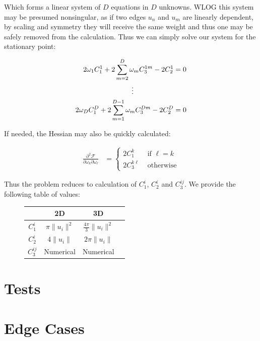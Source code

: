 \documentclass[12pt]{article}
\begin{document}
Which forms a linear system of $D$ equations in $D$ unknowns. WLOG this system may be presumed nonsingular, as if two edges $u_n$ and $u_m$ are linearly dependent, by scaling and symmetry they will receive the same weight and thus one may be safely removed from the calculation. Thus we can simply solve our system for the stationary point:

\begin{align*}
2 \omega_1 C_1^1 + 2 \sum_{m=2}^{D}\omega_{m}C_{3}^{1m}  - 2 C_2^1 &= 0\\
\vdots \hspace{20mm} & \\
2 \omega_D C_1^D + 2 \sum_{m=1}^{D-1}\omega_{m}C_{3}^{Dm} - 2 C_2^D &= 0\\
\end{align*}

If needed, the Hessian may also be quickly calculated:

\begin{align*}
\frac{\partial^2 \mathcal{F}}{\partial \omega_k \partial \omega_\ell} &= \begin{cases}
2C_1^k & \text{ if } \ell = k\\
2C_3^{k\ell} & \text{ otherwise}
\end{cases}
\end{align*}

Thus the problem reduces to calculation of $C_1^i$, $C_2^i$ and $C_3^{ij}$. We provide the following table of values:

\begin{figure}[H]
\centering
\begin{tabular}{|c|c|c|c|}
\hline
 &  2D  & 3D  \\
\hline
 $C_1^i$ & $\pi \| u_i \|^2$  & $\frac{4\pi}{3}\|u_i\|^2$   \\
\hline
 $C_2^i$ & $4\| u_i \|$  & $2\pi \|u_i\|$    \\
\hline
 $C_3^{ij}$ & Numerical  & Numerical    \\
\hline
\end{tabular}
\end{figure}


\section{Tests}

\section{Edge Cases}

\end{document}
